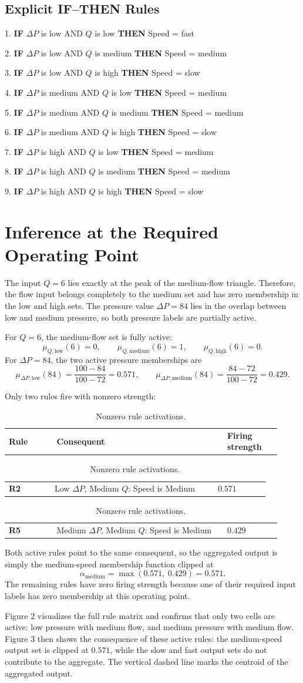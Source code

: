 \documentclass[11pt,a4paper]{article}
\makeatletter
\newcommand{\rowbox}[2]{%
  \noindent\colorbox{#1}{%
    \parbox{\dimexpr\linewidth-2\fboxsep\relax}{#2}%
  }\par\vspace{1pt}%
}
\newcommand{\threecolrow}[4]{%
  \rowbox{#1}{%
    \setlength{\tabcolsep}{2pt}%
    \begin{tabular}{@{}p{0.16\linewidth}p{0.58\linewidth}p{0.18\linewidth}@{}}
      #2 & #3 & #4
    \end{tabular}%
  }%
}
\newcommand{\rulecodeblock}{%
  \noindent\colorbox{codebg}{%
    \parbox{\dimexpr\linewidth-2\fboxsep\relax}{%
      \small
      1. \textbf{IF} \(\Delta P\) is low AND \(Q\) is low \textbf{THEN} Speed = fast\par
      2. \textbf{IF} \(\Delta P\) is low AND \(Q\) is medium \textbf{THEN} Speed = medium\par
      3. \textbf{IF} \(\Delta P\) is low AND \(Q\) is high \textbf{THEN} Speed = slow\par
      4. \textbf{IF} \(\Delta P\) is medium AND \(Q\) is low \textbf{THEN} Speed = medium\par
      5. \textbf{IF} \(\Delta P\) is medium AND \(Q\) is medium \textbf{THEN} Speed = medium\par
      6. \textbf{IF} \(\Delta P\) is medium AND \(Q\) is high \textbf{THEN} Speed = slow\par
      7. \textbf{IF} \(\Delta P\) is high AND \(Q\) is low \textbf{THEN} Speed = medium\par
      8. \textbf{IF} \(\Delta P\) is high AND \(Q\) is medium \textbf{THEN} Speed = medium\par
      9. \textbf{IF} \(\Delta P\) is high AND \(Q\) is high \textbf{THEN} Speed = slow%
    }%
  }%
}
\makeatother
\begin{document}
\subsection*{Explicit IF--THEN Rules}

\rulecodeblock

\section{Inference at the Required Operating Point}

The input \(Q=6\) lies exactly at the peak of the medium-flow triangle. Therefore, the flow input belongs completely to the medium set and has zero membership in the low and high sets. The pressure value \(\Delta P=84\) lies in the overlap between low and medium pressure, so both pressure labels are partially active.

For \(Q=6\), the medium-flow set is fully active:
\[
  \mu_{Q,\text{low}}(6)=0,\qquad
  \mu_{Q,\text{medium}}(6)=1,\qquad
  \mu_{Q,\text{high}}(6)=0.
\]
For \(\Delta P=84\), the two active pressure memberships are
\[
  \mu_{\Delta P,\text{low}}(84)=\frac{100-84}{100-72}=0.571,
  \qquad
  \mu_{\Delta P,\text{medium}}(84)=\frac{84-72}{100-72}=0.429.
\]

Only two rules fire with nonzero strength:

\begin{table}[h]
\centering
\caption{Nonzero rule activations.}
\threecolrow{coolblue2}{\textbf{Rule}}{\textbf{Consequent}}{\textbf{Firing strength}}
\threecolrow{tablerowgray}{\textbf{R2}}{Low \(\Delta P\), Medium \(Q\): Speed is Medium}{\(0.571\)}
\threecolrow{tablerowwhite}{\textbf{R5}}{Medium \(\Delta P\), Medium \(Q\): Speed is Medium}{\(0.429\)}
\end{table}

Both active rules point to the same consequent, so the aggregated output is simply the medium-speed membership function clipped at
\[
  \alpha_{\text{medium}}=\max(0.571,\ 0.429)=0.571.
\]
The remaining rules have zero firing strength because one of their required input labels has zero membership at this operating point.

Figure 2 visualizes the full rule matrix and confirms that only two cells are active: low pressure with medium flow, and medium pressure with medium flow. Figure 3 then shows the consequence of these active rules: the medium-speed output set is clipped at \(0.571\), while the slow and fast output sets do not contribute to the aggregate. The vertical dashed line marks the centroid of the aggregated output.
\end{document}
